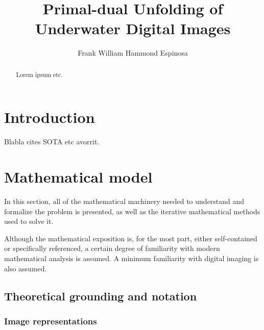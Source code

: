 \documentclass[twocolumn,twoside,a4paper,10pt]{IEEEtran}
\title{Primal-dual Unfolding of\\ Underwater Digital Images}
\author{Frank William Hammond Espinosa}
\begin{document}

\maketitle



\begin{abstract}
\noindent Lorem ipsum etc.
\end{abstract}

\section{Introduction}
Blabla cites SOTA etc avorrit.


\section{Mathematical model}

In this section, all of the mathematical machinery needed to understand and formalize the problem is presented, as well as the iterative mathematical methods used to solve it.

Although the mathematical exposition is, for the most part, either self-contained or specifically referenced, a certain degree of familiarity with modern mathematical analysis is assumed. A minimum familiarity with digital imaging is also assumed.
\subsection{Theoretical grounding and notation}\label{subsec:theoretical-grounding}
\subsubsection{Image representations}
\end{document}
